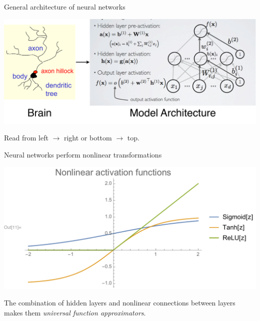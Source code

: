 \documentclass[compress]{beamer}
\begin{document}

\begin{frame}{General architecture of neural networks}
  \begin{center}
    \includegraphics[width=1.00\textwidth]{./figures/brain_to_model.pdf}
  \end{center}
  Read from left \(\rightarrow\) right or bottom \(\rightarrow\) top.
\end{frame}

\begin{frame}{Neural networks perform nonlinear transformations}
  \begin{center}
    \includegraphics[width=1.00\textwidth]{./figures/nonlinear_activation.pdf}
  \end{center}
  The combination of hidden layers and nonlinear connections between layers makes them \emph{universal function approximators}.
\end{frame}

\end{document}
